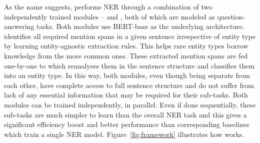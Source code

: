 


As the name suggests, \modelname{} performs NER through a combination of two independently trained modules  -- \spandetect{} and \spanclass{}, both of which are modeled as question-answering tasks. Both modules use BERT-base as the underlying architecture. \spandetect{} identifies all required mention spans in a given sentence irrespective of entity type by learning entity-agnostic extraction rules. This helps rare entity types borrow knowledge from the more common ones. These extracted mention spans are fed one-by-one to \spanclass{} which reanalyses them in the sentence structure and classifies them into an entity type. In this way, both modules, even though being separate from each other, have complete access to full sentence structure and do not suffer from lack of any essential information that may be required for their sub-tasks. Both modules can be trained independently, in parallel. Even if done sequentially, these sub-tasks are much simpler to learn than the overall NER task and this gives \modelname{} a significant efficiency boost and better performance than corresponding baselines which train a single NER model. Figure~\ref{fig:framework} illustrates how \modelname{} works. 


